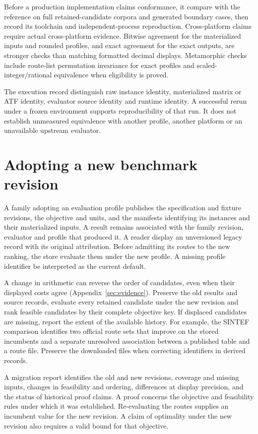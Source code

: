 Before a production implementation claims conformance, it \should{} compare with the reference on full retained-candidate corpora and generated boundary cases, then record its toolchain and independent-process reproduction. Cross-platform claims require actual cross-platform evidence. Bitwise agreement for the materialized inputs and rounded profiles, and exact agreement for the exact outputs, are stronger checks than matching formatted decimal displays. Metamorphic checks \should{} include route-list permutation invariance for exact profiles and scaled-integer/rational equivalence when eligibility is proved.

The execution record \must{} distinguish raw instance identity, materialized matrix or ATF identity, evaluator source identity and runtime identity. A successful rerun under a frozen environment supports reproducibility of that run. It does not establish unmeasured equivalence with another profile, another platform or an unavailable upstream evaluator.

\section{Adopting a new benchmark revision}\label{sec:migration}

A family adopting an evaluation profile publishes the specification and fixture revisions, the objective and units, and the manifests identifying its instances and their materialized inputs. A result remains associated with the family revision, evaluator and profile that produced it. A reader \may{} display an unversioned legacy record with its original attribution. Before admitting its routes to the new ranking, the store \must{} evaluate them under the new profile. A missing profile identifier \mustnot{} be interpreted as the current default.

A change in arithmetic can reverse the order of candidates, even when their displayed costs agree (Appendix~\ref{sec:evidence}). Preserve the old results and source records, evaluate every retained candidate under the new revision and rank feasible candidates by their complete objective key. If displaced candidates are missing, report the extent of the available history. For example, the SINTEF comparison identifies two official route sets that improve on the stored incumbents and a separate unresolved association between a published table and a route file. Preserve the downloaded files when correcting identifiers in derived records.

A migration report identifies the old and new revisions, coverage and missing inputs, changes in feasibility and ordering, differences at display precision, and the status of historical proof claims. A proof concerns the objective and feasibility rules under which it was established. Re-evaluating the routes supplies an incumbent value for the new revision. A claim of optimality under the new revision also requires a valid bound for that objective.

